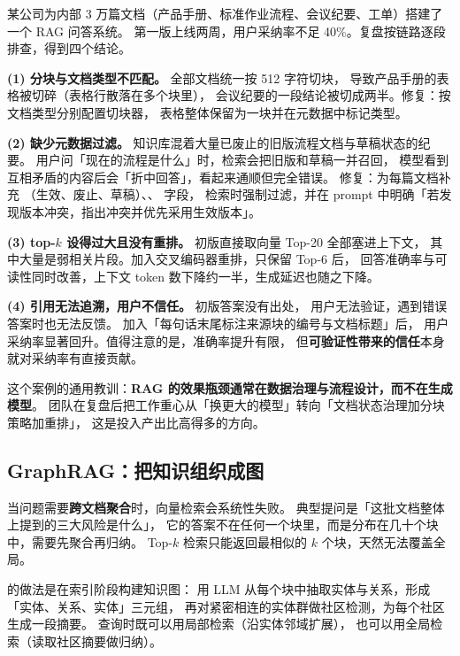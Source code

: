 \begin{casebox}
某公司为内部 3 万篇文档（产品手册、标准作业流程、会议纪要、工单）搭建了一个 RAG 问答系统。
第一版上线两周，用户采纳率不足 40\%。复盘按链路逐段排查，得到四个结论。

\textbf{(1) 分块与文档类型不匹配。} 全部文档统一按 512 字符切块，
导致产品手册的表格被切碎（表格行散落在多个块里），
会议纪要的一段结论被切成两半。修复：按文档类型分别配置切块器，
表格整体保留为一块并在元数据中标记类型。

\textbf{(2) 缺少元数据过滤。} 知识库混着大量已废止的旧版流程文档与草稿状态的纪要。
用户问「现在的流程是什么」时，检索会把旧版和草稿一并召回，
模型看到互相矛盾的内容后会「折中回答」，看起来通顺但完全错误。
修复：为每篇文档补充 （生效、废止、草稿）、、 字段，
检索时强制过滤，并在 prompt 中明确「若发现版本冲突，指出冲突并优先采用生效版本」。

\textbf{(3) top-$k$ 设得过大且没有重排。} 初版直接取向量 Top-20 全部塞进上下文，
其中大量是弱相关片段。加入交叉编码器重排，只保留 Top-6 后，
回答准确率与可读性同时改善，上下文 token 数下降约一半，生成延迟也随之下降。

\textbf{(4) 引用无法追溯，用户不信任。} 初版答案没有出处，
用户无法验证，遇到错误答案时也无法反馈。
加入「每句话末尾标注来源块的编号与文档标题」后，
用户采纳率显著回升。值得注意的是，准确率提升有限，
但\textbf{可验证性带来的信任}本身就对采纳率有直接贡献。

这个案例的通用教训：\textbf{RAG 的效果瓶颈通常在数据治理与流程设计，而不在生成模型}。
团队在复盘后把工作重心从「换更大的模型」转向「文档状态治理加分块策略加重排」，
这是投入产出比高得多的方向。
\end{casebox}

\subsection{GraphRAG：把知识组织成图}

当问题需要\textbf{跨文档聚合}时，向量检索会系统性失败。
典型提问是「这批文档整体上提到的三大风险是什么」，
它的答案不在任何一个块里，而是分布在几十个块中，需要先聚合再归纳。
Top-$k$ 检索只能返回最相似的 $k$ 个块，天然无法覆盖全局。

 的做法是在索引阶段构建知识图：
用 LLM 从每个块中抽取实体与关系，形成「实体、关系、实体」三元组，
再对紧密相连的实体群做社区检测，为每个社区生成一段摘要。
查询时既可以用局部检索（沿实体邻域扩展），
也可以用全局检索（读取社区摘要做归纳）。

